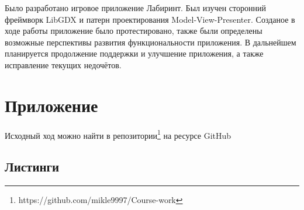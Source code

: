 Было разработано игровое приложение Лабиринт. Был изучен сторонний фреймворк LibGDX и патерн проектирования Model-View-Presenter. Созданое в ходе работы приложение было протестировано, также были определены возможные перспективы развития функциональности приложения. В дальнейшем планируется продолжение поддержки и улучшение приложения, а также исправление текущих недочётов.

\section{Приложение}

Исходный ход можно найти в репозитории\footnote{https://github.com/mikle9997/Course-work} на ресурсе GitHub

\subsection{Листинги}
















 

 







